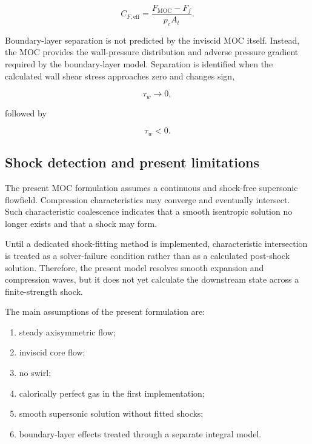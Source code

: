 \begin{equation}
    \boxed{
    C_{F,\mathrm{eff}}
    =
    \frac{F_{\mathrm{MOC}}-F_f}{p_cA_t}
    }.
    \label{eq:moc_effective_cf}
\end{equation}

Boundary-layer separation is not predicted by the inviscid MOC itself.
Instead, the MOC provides the wall-pressure distribution and adverse
pressure gradient required by the boundary-layer model. Separation is
identified when the calculated wall shear stress approaches zero and
changes sign,

\begin{equation}
    \tau_w \rightarrow 0,
\end{equation}

followed by

\begin{equation}
    \tau_w<0.
\end{equation}

\subsection{Shock detection and present limitations}

The present MOC formulation assumes a continuous and shock-free
supersonic flowfield. Compression characteristics may converge and
eventually intersect. Such characteristic coalescence indicates that a
smooth isentropic solution no longer exists and that a shock may form.

Until a dedicated shock-fitting method is implemented, characteristic
intersection is treated as a solver-failure condition rather than as a
calculated post-shock solution. Therefore, the present model resolves
smooth expansion and compression waves, but it does not yet calculate
the downstream state across a finite-strength shock.

The main assumptions of the present formulation are:

\begin{enumerate}
    \item steady axisymmetric flow;

    \item inviscid core flow;

    \item no swirl;

    \item calorically perfect gas in the first implementation;

    \item smooth supersonic solution without fitted shocks;

    \item boundary-layer effects treated through a separate integral
    model.
\end{enumerate}

